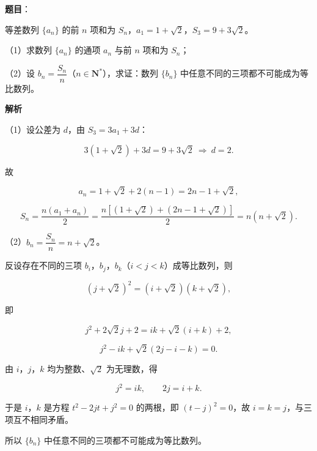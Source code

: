 \begin{answer}

\textbf{题目}：

等差数列 $\{a_n\}$ 的前 $n$ 项和为 $S_n$，$a_1=1+\sqrt2$，$S_3=9+3\sqrt2$。

（1）求数列 $\{a_n\}$ 的通项 $a_n$ 与前 $n$ 项和为 $S_n$；

（2）设 $b_n=\dfrac{S_n}n$（$n\in\mathbf N^*$），求证：数列 $\{b_n\}$ 中任意不同的三项都不可能成为等比数列。

\textbf{解析}

（1）设公差为 $d$，由 $S_3=3a_1+3d$：

\nopagebreak[4]
\[3(1+\sqrt2)+3d=9+3\sqrt2\ \Longrightarrow\ d=2.\]

故

\nopagebreak[4]
\[a_n=1+\sqrt2+2(n-1)=2n-1+\sqrt2,\]

\nopagebreak[4]
\[S_n=\frac{n(a_1+a_n)}2=\frac{n\left[(1+\sqrt2)+(2n-1+\sqrt2)\right]}2=n(n+\sqrt2).\]

（2）$b_n=\dfrac{S_n}n=n+\sqrt2$。

反设存在不同的三项 $b_i$，$b_j$，$b_k$（$i<j<k$）成等比数列，则

\nopagebreak[4]
\[(j+\sqrt2)^2=(i+\sqrt2)(k+\sqrt2),\]

即

\nopagebreak[4]
\[j^2+2\sqrt2 j+2=ik+\sqrt2(i+k)+2,\]

\nopagebreak[4]
\[j^2-ik+\sqrt2\left(2j-i-k\right)=0.\]

由 $i$，$j$，$k$ 均为整数、$\sqrt2$ 为无理数，得

\nopagebreak[4]
\[j^2=ik,\qquad 2j=i+k.\]

于是 $i$，$k$ 是方程 $t^2-2jt+j^2=0$ 的两根，即 $(t-j)^2=0$，故 $i=k=j$，与三项互不相同矛盾。

所以 $\{b_n\}$ 中任意不同的三项都不可能成为等比数列。


\end{answer}
